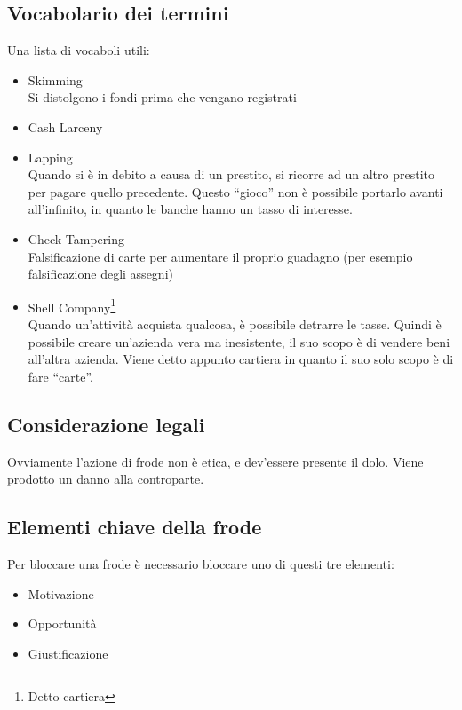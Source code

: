 
\subsection{Vocabolario dei termini}

Una lista di vocaboli utili:
\begin{itemize}
  \item Skimming \\
  Si distolgono i fondi prima che vengano registrati
  \item Cash Larceny
  \item Lapping \\
  Quando si è in debito a causa di un prestito, si ricorre ad un
  altro prestito per pagare quello precedente. Questo ``gioco'' non è possibile
  portarlo avanti all'infinito, in quanto le banche hanno un tasso di interesse.
  \item Check Tampering \\
  Falsificazione di carte per aumentare il proprio guadagno (per esempio
falsificazione degli assegni)
  \item Shell Company\footnote{Detto cartiera} \\
  Quando un'attività acquista qualcosa, è possibile detrarre le tasse. Quindi è
  possibile creare un'azienda vera ma inesistente, il suo scopo è di vendere
  beni all'altra azienda. Viene detto appunto cartiera in quanto il suo solo
  scopo è di fare ``carte''.
\end{itemize}

\subsection{Considerazione legali}

Ovviamente l'azione di frode non è etica, e dev'essere presente il dolo. Viene
prodotto un danno alla controparte.

\subsection{Elementi chiave della frode}

Per bloccare una frode è necessario bloccare uno di questi tre elementi:
\begin{itemize}
  \item Motivazione
  \item Opportunità
  \item Giustificazione
\end{itemize}

